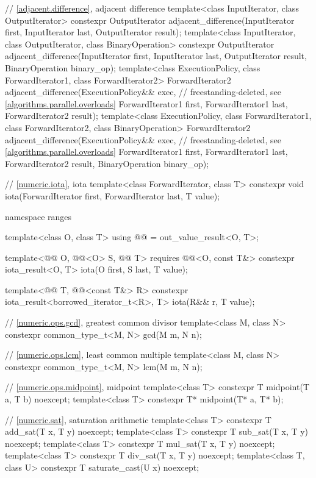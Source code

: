 \begin{codeblock}
{  // \ref{adjacent.difference}, adjacent difference
  template<class InputIterator, class OutputIterator>
    constexpr OutputIterator
      adjacent_difference(InputIterator first, InputIterator last,
                          OutputIterator result);
  template<class InputIterator, class OutputIterator, class BinaryOperation>
    constexpr OutputIterator
      adjacent_difference(InputIterator first, InputIterator last,
                          OutputIterator result, BinaryOperation binary_op);
  template<class ExecutionPolicy, class ForwardIterator1, class ForwardIterator2>
    ForwardIterator2
      adjacent_difference(ExecutionPolicy&& exec,               // freestanding-deleted, see \ref{algorithms.parallel.overloads}
                          ForwardIterator1 first, ForwardIterator1 last,
                          ForwardIterator2 result);
  template<class ExecutionPolicy, class ForwardIterator1, class ForwardIterator2,
           class BinaryOperation>
    ForwardIterator2
      adjacent_difference(ExecutionPolicy&& exec,               // freestanding-deleted, see \ref{algorithms.parallel.overloads}
                          ForwardIterator1 first, ForwardIterator1 last,
                          ForwardIterator2 result, BinaryOperation binary_op);

  // \ref{numeric.iota}, iota
  template<class ForwardIterator, class T>
    constexpr void iota(ForwardIterator first, ForwardIterator last, T value);

  namespace ranges {
    template<class O, class T>
      using @@ = out_value_result<O, T>;

    template<@@ O, @@<O> S, @@ T>
      requires @@<O, const T&>
      constexpr iota_result<O, T> iota(O first, S last, T value);

    template<@@ T, @@<const T&> R>
      constexpr iota_result<borrowed_iterator_t<R>, T> iota(R&& r, T value);
  }

  // \ref{numeric.ops.gcd}, greatest common divisor
  template<class M, class N>
    constexpr common_type_t<M, N> gcd(M m, N n);

  // \ref{numeric.ops.lcm}, least common multiple
  template<class M, class N>
    constexpr common_type_t<M, N> lcm(M m, N n);

  // \ref{numeric.ops.midpoint}, midpoint
  template<class T>
    constexpr T midpoint(T a, T b) noexcept;
  template<class T>
    constexpr T* midpoint(T* a, T* b);

  // \ref{numeric.sat}, saturation arithmetic
  template<class T>
    constexpr T add_sat(T x, T y) noexcept;
  template<class T>
    constexpr T sub_sat(T x, T y) noexcept;
  template<class T>
    constexpr T mul_sat(T x, T y) noexcept;
  template<class T>
    constexpr T div_sat(T x, T y) noexcept;
  template<class T, class U>
    constexpr T saturate_cast(U x) noexcept;
}
\end{codeblock}

